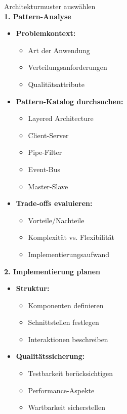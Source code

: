 \begin{KR}{Architekturmuster auswählen}\\
\textbf{1. Pattern-Analyse}
\begin{itemize}
    \item \textbf{Problemkontext:}
    \begin{itemize}
        \item Art der Anwendung
        \item Verteilungsanforderungen
        \item Qualitätsattribute
    \end{itemize}
    
    \item \textbf{Pattern-Katalog durchsuchen:}
    \begin{itemize}
        \item Layered Architecture
        \item Client-Server
        \item Pipe-Filter
        \item Event-Bus
        \item Master-Slave
    \end{itemize}
    
    \item \textbf{Trade-offs evaluieren:}
    \begin{itemize}
        \item Vorteile/Nachteile
        \item Komplexität vs. Flexibilität
        \item Implementierungsaufwand
    \end{itemize}
\end{itemize}

\textbf{2. Implementierung planen}
\begin{itemize}
    \item \textbf{Struktur:}
    \begin{itemize}
        \item Komponenten definieren
        \item Schnittstellen festlegen
        \item Interaktionen beschreiben
    \end{itemize}
    
    \item \textbf{Qualitätssicherung:}
    \begin{itemize}
        \item Testbarkeit berücksichtigen
        \item Performance-Aspekte
        \item Wartbarkeit sicherstellen
    \end{itemize}
\end{itemize}
\end{KR}

